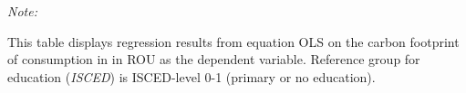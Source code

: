 \begin{table}[htbp!]
\begin{adjustbox}{width = 1\textwidth, max height = 0.95\textheight, center}
\begin{threeparttable}[b]
         \begin{tablenotes}\item \medskip \textit{Note:}
            \item This table displays regression results from equation OLS on the carbon footprint of consumption in  in ROU as the dependent variable.  Reference group for education (\textit{ISCED}) is ISCED-level 0-1 (primary or no education).
         \end{tablenotes}
      \end{threeparttable}
   \end{adjustbox}
\end{table}


